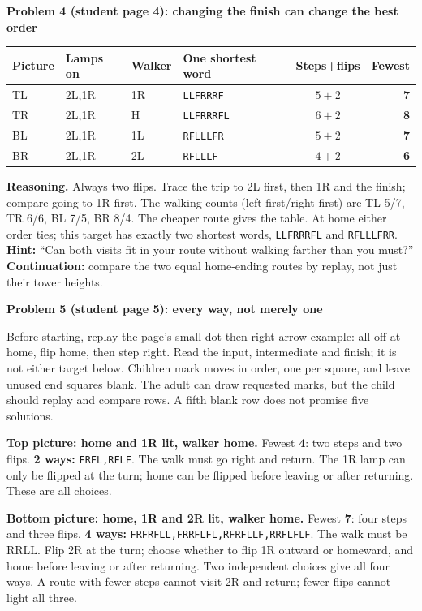 \documentclass[11pt]{article}
\makeatletter
\newcommand{\sub}[1]{\par\textbf{#1}\par}
\newcommand{\keyrow}[8]{#2 & #3 & #4 & \texttt{#5} & $#6+#7$ & \textbf{#8}\\}
\newcommand{\allways}[3]{\textbf{#2 ways:} \texttt{#3}}
\newenvironment{keytable}{\par\smallskip\begingroup\small\setlength{\tabcolsep}{7pt}\renewcommand{\arraystretch}{1.15}\begin{tabular}{@{}llllcr@{}}\textbf{Picture}&\textbf{Lamps on}&\textbf{Walker}&\textbf{One shortest word}&\textbf{Steps+flips}&\textbf{Fewest}\\\midrule}{\end{tabular}\endgroup\par\smallskip}
\makeatother
\begin{document}
\sub{Problem 4 (student page 4): changing the finish can change the best order}
\begin{keytable}
\keyrow{4TL}{TL}{2L,1R}{1R}{LLFRRRF}{5}{2}{7}
\keyrow{4TR}{TR}{2L,1R}{H}{LLFRRRFL}{6}{2}{8}
\keyrow{4BL}{BL}{2L,1R}{1L}{RFLLLFR}{5}{2}{7}
\keyrow{4BR}{BR}{2L,1R}{2L}{RFLLLF}{4}{2}{6}
\end{keytable}
\textbf{Reasoning.} Always two flips. Trace the trip to 2L first, then 1R and the finish; compare going to 1R first. The walking counts (left first/right first) are TL 5/7, TR 6/6, BL 7/5, BR 8/4. The cheaper route gives the table. At home either order ties; this target has exactly two shortest words, \texttt{LLFRRRFL} and \texttt{RFLLLFRR}.
\textbf{Hint:} ``Can both visits fit in your route without walking farther than you must?'' \textbf{Continuation:} compare the two equal home-ending routes by replay, not just their tower heights.

\sub{Problem 5 (student page 5): every way, not merely one}
Before starting, replay the page's small dot-then-right-arrow example: all off at home, flip home, then step right. Read the input, intermediate and finish; it is not either target below. Children mark moves in order, one per square, and leave unused end squares blank. The adult can draw requested marks, but the child should replay and compare rows. A fifth blank row does not promise five solutions.

\textbf{Top picture: home and 1R lit, walker home.} Fewest \textbf{4}: two steps and two flips. \allways{5top}{2}{FRFL,RFLF}. The walk must go right and return. The 1R lamp can only be flipped at the turn; home can be flipped before leaving or after returning. These are all choices.

\textbf{Bottom picture: home, 1R and 2R lit, walker home.} Fewest \textbf{7}: four steps and three flips. \allways{5bottom}{4}{FRFRFLL,FRRFLFL,RFRFLLF,RRFLFLF}. The walk must be RRLL. Flip 2R at the turn; choose whether to flip 1R outward or homeward, and home before leaving or after returning. Two independent choices give all four ways. A route with fewer steps cannot visit 2R and return; fewer flips cannot light all three.
\end{document}
